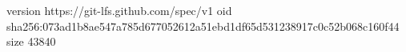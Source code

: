 version https://git-lfs.github.com/spec/v1
oid sha256:073ad1b8ae547a785d677052612a51ebd1df65d531238917c0c52b068c160f44
size 43840
